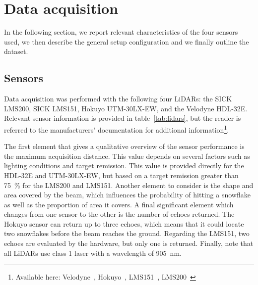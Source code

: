 \section{Data acquisition}
In the following section, we report relevant characteristics of the four sensors used, we then describe the general setup configuration and we finally outline the dataset. 

\subsection{Sensors}

Data acquisition was performed with the following four LiDARs: the SICK LMS200, SICK LMS151, Hokuyo UTM-30LX-EW, and the Velodyne HDL-32E. Relevant sensor information is provided in table~\ref{tab:lidars}, but the reader is referred to the manufacturers' documentation for additional information\footnote{Available here: Velodyne~\cite{VelodyneManual}, Hokuyo~\cite{UTMDatasheet}, LMS151~\cite{LMS151Datasheet}, LMS200~\cite{LMS200Manual}}.

The first element that gives a qualitative overview of the sensor performance is the maximum acquisition distance. This value depends on several factors such as lighting conditions and target remission. This value is provided directly for the HDL-32E and UTM-30LX-EW, but based on a target remission greater than \SI{75}{\percent} for the LMS200 and LMS151. Another element to consider is the shape and area covered by the beam, which influences the probability of hitting a snowflake as well as the proportion of area it covers. A final significant element which changes from one sensor to the other is the number of echoes returned. The Hokuyo sensor can return up to three echoes, which means that it could locate two snowflakes before the beam reaches the ground. Regarding the LMS151, two echoes are evaluated by the hardware, but only one is returned. Finally, note that all LiDARs use class 1 laser with a wavelength of \SI{905}{\nano\meter}.

